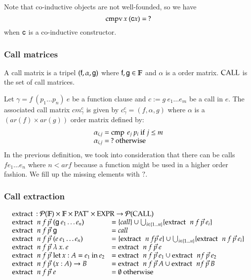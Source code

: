 \noindent Note that co-inductive objects are not well-founded, so we have 
\[\operatorname{cmpv} x \: (\mathsf{c} x) = \: ? \]
when $\mathsf{c}$ is a co-inductive constructor. 

\newcommand{\call}{\opn{CALL}}

\subsubsection{Call matrices}
A call matrix is a tripel $(\mathsf{f},\alpha,\mathsf{g})$ where $\mathsf{f},\mathsf{g} \in \mathbb{F}$ and $\alpha$ is a order matrix.
$\call$ is the set of call matrices. 

Let $\gamma = f \: (p_1 \ldots p_n) \: e$ be a function clause and $c := g \: e_1 \ldots e_m$ be a call in $e$.
The associated call matrix $cm_{\gamma}^{c}$ is given by $c_{\gamma}^{c} = (f,\alpha,g)$ where $\alpha$ is a $(ar(f) \times ar(g))$ order matrix defined by:
\[ 
\begin{array}[t]{l}
\alpha_{i,j} = \operatorname{cmp} \: e_j \: p_i \mbox{ if } j \leq m \\
\alpha_{i,j} = \: ? \mbox{ otherwise} 
\end{array}
\]
In the previous definition, we took into consideration that there can be calls $f e_1 \ldots e_n$ where $n < ar f$ because a function might be used in a higher order fashion. We fill up the missing elements with $?$. 

\subsubsection{Call extraction}
\[
\begin{array}[t]{ll}
\multicolumn{2}{l}{\extr : \pset{\cF} \times \cF \times \ves{\Pat} \times \Expr \ra \pset{\call}}\\ 
\extr \: n \: f \: \vec{p} \; (\fg \: e_1 \ldots e_n) & = \{ call \} \cup \bigcup_{i \in \{ 1 \ldots n \}} \{\extr \: n \: f \: \vec{p} \: e_i \}\\  
\extr \: n \: f \: \vec{p} \; \fg & = call \\
\extr \: n \: f \: \vec{p} \; (e \: e_1 \ldots e_n) & =  \{\extr \: n \: f \vec{p} \: e\} \cup \bigcup_{i \in \{ 1 \ldots n \}} \{\extr \: n \: f \: \vec{p} \: e_i\}\\ 
\extr \: n \: f \: \vec{p} \; \lam{x}e & = \extr \: n \: f \: \vec{p} \: e \\
\extr \: n \: f \: \vec{p} \; \ELet{x}{A}{e_1}{e_2} & = \extr \: n \: f \: \vec{p} \: e_1 \cup \extr \: n f \: \vec{p} \: e_2 \\
\extr \: n \: f \: \vec{p} \; \EPi{x}{A}{B} & =  \extr \: n \: f \: \vec{p} \: A \cup \extr \: n f \: \vec{p} \: B \\ 
\extr \: n \: f \: \vec{p} \; e & = \emptyset \mbox{ otherwise}   
\end{array}
\]

